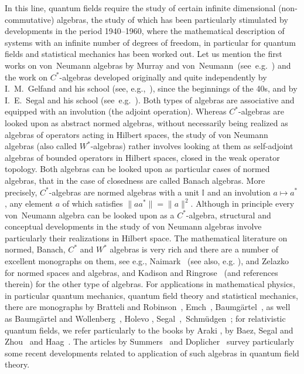 \documentclass{article}
\newcommand{\asterisk}{\mathord{*}}
\begin{document}
In this line, quantum fields require the study of certain infinite dimensional
(non-commutative) algebras, the study of which has been particularly
stimulated by developments in the period 1940--1960, where the mathematical
description of systems with an infinite number of degrees of freedom, in
particular for quantum fields and statistical mechanics has been worked out.
Let us mention the first works on von~Neumann algebras by Murray and
von~Neumann~(see~e.g.~{\cite{VonNeumann}}) and the work on
$C^{\asterisk}$-algebras developed originally and quite independently by
I.~M.~Gelfand and his school (see, e.g.,~{\cite{Gelfand}}), since the
beginnings of the 40s, and by I.~E.~Segal and his school
(see~e.g.~{\cite{Segal1,Segalbook}}). Both types of algebras are associative
and equipped with an involution (the adjoint operation). Whereas
$C^{\ast}$-algebras are looked upon as abstract normed algebras, without
necessarily being realized as algebras of operators acting in Hilbert spaces,
the study of von Neumann algebras (also called $W^{\ast}$-algebras) rather
involves looking at them as self-adjoint algebras of bounded operators in
Hilbert spaces, closed in the weak operator topology. Both algebras can be
looked upon as particular cases of normed algebras, that in the case of
closedness are called Banach algebras. More precisely, $C^{\ast}$-algebras are
normed algebras with a unit $\mathbb{I}$ and an involution $a \mapsto
a^{\ast}$, any element $a$ of which satisfies $\| a a^{\ast} \| = \| a \|^2$.
Although in principle every von~Neumann algebra can be looked upon as a
$C^{\ast}$-algebra, structural and conceptual developments in the study of von
Neumann algebras involve particularly their realizations in Hilbert space. The
mathematical literature on normed, Banach, $C^{\ast}$ and $W^{\ast}$ algebras
is very rich and there are a number of excellent monographs on them, see e.g.,
Naimark~{\cite{Naimark}} (see also, e.g. {\cite{bonsall_complete_1973}}), and
Zelazko~{\cite{MR0448079}} for normed spaces and algebras, and Kadison and
Ringrose~{\cite{Kadison1,Kadison2}} (and references therein) for the other
type of algebras. For applications in mathematical physics, in particular
quantum mechanics, quantum field theory and statistical mechanics, there are
monographs by Bratteli and Robinson~{\cite{Bratteli1,Bratteli2}},
Emch~{\cite{Emch}}, Baumg{\"a}rtel~{\cite{Baumgartel1}}, as well as
Baumg{\"a}rtel and Wollenberg~{\cite{Baumgartel2}}, Holevo {\cite{Holevo}},
Segal~{\cite{Segalbook2}},~Schm{\"u}dgen~{\cite{schmudgen_unbounded_1990}};
for relativistic quantum fields, we refer particularly to the books by Araki
{\cite{MR1799198}}, by Baez, Segal and Zhou~{\cite{Segalbook}} and
Haag~{\cite{Haag1}}. The articles by Summers~{\cite{summers2012perspective}}
and Doplicher~{\cite{Doplicher}} survey particularly some recent developments
related to application of such algebras in quantum field theory.
\end{document}
